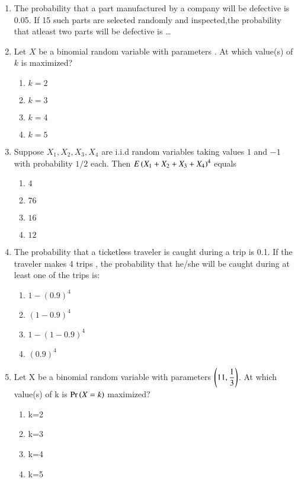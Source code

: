 \renewcommand{\theequation}{\theenumi}
\renewcommand{\thefigure}{\theenumi}
\renewcommand{\thetable}{\theenumi}
\begin{enumerate}[label=\thesection.\arabic*.,ref=\thesection.\theenumi]

\item The probability that a part manufactured by a company will be defective is 0.05. If 15 such parts are selected randomly and inspected,the probability that atleast two parts will be defective is \dots
%
\\
\solution
%

%
\item Let $X$ be a binomial random variable with parameters . At which value(s) of $k$ is  maximized?\\
\begin{enumerate}
\item $k=2$ 
\item $k=3$ 
\item $k=4$ 
\item $k=5$
\end{enumerate}
%
\solution
%

%
\item Suppose $X_1,X_2,X_3,X_4$ are i.i.d random variables taking values $1$ and $-1$ with probability $1/2$ each. Then $E\left(X_1+X_2 +X_3 +X_4\right)^4$ equals
\begin{multicols}{4}
\begin{enumerate}
    \item $4$
    \item $76$
    \item $16$
    \item $12$
\end{enumerate}
\end{multicols}
\solution
%


\item The probability that a ticketless traveler is caught during a trip is 0.1. If the traveler makes 4 trips , the probability that he/she will be caught during at least one of the trips is:\\
\begin{enumerate}
    \item $1-(0.9)^4$
    \item $(1-0.9)^4$
    \item $1-(1-0.9)^4$
    \item $(0.9)^4$
\end{enumerate}
\solution

%
\item Let X be a binomial random variable with parameters  $\left(11,\displaystyle{\frac{1}{3}}\right)$. At which value(s) of k is $\Pr\left(X = k\right)$ maximized?\\
\begin{enumerate}
\item k=2
\item k=3
\item k=4
\item k=5
\end{enumerate}
%
\solution



\end{enumerate}